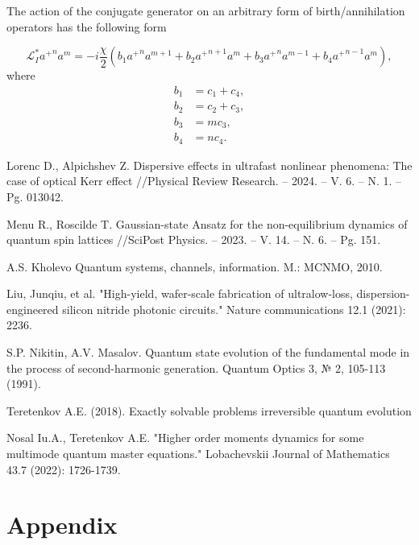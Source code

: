 \documentclass[12pt]{article}
\theoremstyle{definition}
\begin{document}
	The action of the conjugate generator on an arbitrary form of birth/annihilation operators has the following form
	
	\begin{equation}
		\label{eq:ConjStrongFild}
		\mathcal{L}^*_I{a^+}^na^m =  -i\frac{\chi}{2}\left(  b_1{a^+}^na^{m+1} + b_2{a^+}^{n+1}a^m  + b_3{a^+}^na^{m-1} + b_4{a^+}^{n-1}a^m \right),
	\end{equation}
	where
	\begin{align*}
		b_1 &= c_1 + c_4,\\
		b_2 &= c_2 + c_3,\\
		b_3 &= mc_3,\\
		b_4 &= nc_4.
	\end{align*}
	
	\begin{thebibliography}{99}
		
		 Lorenc D., Alpichshev Z. Dispersive effects in ultrafast nonlinear phenomena: The case of optical Kerr effect //Physical Review Research. – 2024. – V. 6. – N. 1. – Pg. 013042.
		
		 Menu R., Roscilde T. Gaussian-state Ansatz for the non-equilibrium dynamics of quantum spin lattices //SciPost Physics. – 2023. – V. 14. – N. 6. – Pg. 151.
		
		 A.S. Kholevo Quantum systems, channels, information. M.: MCNMO, 2010.
		
		 Liu, Junqiu, et al. "High-yield, wafer-scale fabrication of ultralow-loss, dispersion-engineered silicon nitride photonic circuits." Nature communications 12.1 (2021): 2236.
		
		 S.P. Nikitin, A.V. Masalov. Quantum state evolution of the fundamental mode in the process of second-harmonic generation. Quantum Optics 3, № 2, 105-113 (1991).
		
		 Teretenkov A.E. (2018). Exactly solvable problems
		irreversible quantum evolution
		
		 Nosal Iu.A., Teretenkov A.E.  "Higher order moments dynamics for some multimode quantum master equations." Lobachevskii Journal of Mathematics 43.7 (2022): 1726-1739.
		
	\end{thebibliography}
	\newpage
	\section{Appendix\label{App}}
	
\end{document}
